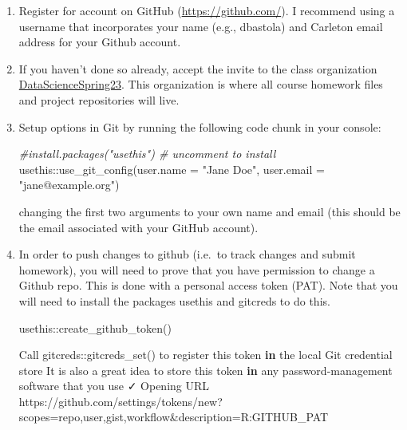 \documentclass[
]{book}
\newenvironment{Shaded}{\begin{snugshade}}{\end{snugshade}}
\newcommand{\AttributeTok}[1]{\textcolor[rgb]{0.77,0.63,0.00}{#1}}
\newcommand{\CommentTok}[1]{\textcolor[rgb]{0.56,0.35,0.01}{\textit{#1}}}
\newcommand{\ControlFlowTok}[1]{\textcolor[rgb]{0.13,0.29,0.53}{\textbf{#1}}}
\newcommand{\FunctionTok}[1]{\textcolor[rgb]{0.00,0.00,0.00}{#1}}
\newcommand{\NormalTok}[1]{#1}
\newcommand{\SpecialCharTok}[1]{\textcolor[rgb]{0.00,0.00,0.00}{#1}}
\newcommand{\StringTok}[1]{\textcolor[rgb]{0.31,0.60,0.02}{#1}}
\begin{document}
\begin{enumerate}
\def\labelenumi{\arabic{enumi}.}
\item
  Register for account on GitHub (\url{https://github.com/}). I recommend
  using a username that incorporates your name (e.g., dbastola) and Carleton email address for your Github account.
\item
  If you haven't done so already, accept the invite to the class organization \href{https://github.com/DataScienceSpring23}{DataScienceSpring23}. This organization is where all course homework files and project repositories will live.
\item
  Setup options in Git by running the following code chunk in your
  console:

\begin{Shaded}
\begin{Highlighting}[]
\CommentTok{\#install.packages("usethis")  \# uncomment to install}
\NormalTok{usethis}\SpecialCharTok{::}\FunctionTok{use\_git\_config}\NormalTok{(}\AttributeTok{user.name =} \StringTok{"Jane Doe"}\NormalTok{, }\AttributeTok{user.email =} \StringTok{"jane@example.org"}\NormalTok{)}
\end{Highlighting}
\end{Shaded}

  changing the first two arguments to your own name and email (this should
  be the email associated with your GitHub account).
\item
  In order to push changes to github (i.e.~to track changes and submit homework), you will need to prove that you have permission to change a Github repo. This is done with a personal access token (PAT). Note that you will need to install the packages usethis and gitcreds to do this.

\begin{Shaded}
\begin{Highlighting}[]
\NormalTok{usethis}\SpecialCharTok{::}\FunctionTok{create\_github\_token}\NormalTok{()}
\end{Highlighting}
\end{Shaded}

\begin{Shaded}
\begin{Highlighting}[]
\NormalTok{ Call }\StringTok{\textasciigrave{}}\AttributeTok{gitcreds::gitcreds\_set()}\StringTok{\textasciigrave{}}\NormalTok{ to register this token }\ControlFlowTok{in}\NormalTok{ the local Git credential store}
\NormalTok{ It is also a great idea to store this token }\ControlFlowTok{in}\NormalTok{ any password}\SpecialCharTok{{-}}\NormalTok{management software that you use}
\NormalTok{ ✓ Opening URL }\StringTok{\textquotesingle{}https://github.com/settings/tokens/new?scopes=repo,user,gist,workflow\&description=R:GITHUB\_PAT\textquotesingle{}}
\end{Highlighting}
\end{Shaded}


\end{enumerate}
\end{document}
